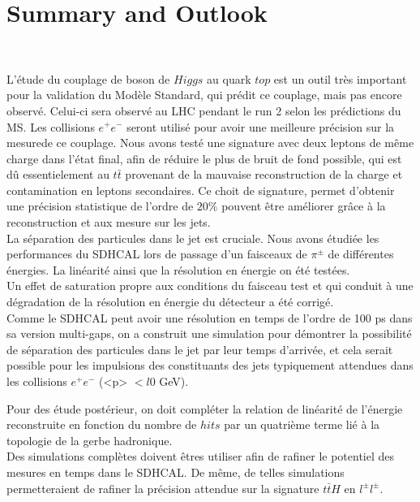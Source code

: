 \section*{Summary and Outlook}

~\par L'\'etude du couplage de boson de $Higgs$ au quark $top$ est un outil tr\`es important pour la validation du Mod\`ele Standard, qui pr\'edit ce couplage, mais pas encore observé. Celui-ci sera observé au LHC pendant le run 2 selon les prédictions du MS. Les collisions $e^+e^-$ seront utilisé pour avoir une meilleure pr\'ecision sur la mesurede ce couplage. Nous avons testé une signature avec deux leptons de m\^eme charge dans l'\'etat final, afin de réduire le plus de bruit de fond possible, qui est d\^u essentielement au $t\bar{t}$ provenant de la mauvaise reconstruction de la charge et contamination en leptons secondaires. Ce choit de signature, permet d'obtenir une précision statistique de l'ordre de $20\%$ pouvent être améliorer grâce à la reconstruction et aux mesure sur les jets.\\
La s\'eparation des particules dans le jet est cruciale. Nous avons \'etudiée les performances du SDHCAL lors de passage d'un faisceaux de $\pi^{\pm}$ de diff\'erentes \'energies. La linéarité ainsi que la résolution en énergie on été testées. \\
Un effet de saturation propre aux conditions du faisceau test et qui conduit \`a une d\'egradation de la r\'esolution en \'energie du d\'etecteur a été corrigé. \\
Comme le SDHCAL peut avoir une r\'esolution en temps de l'ordre de 100 ps dans sa version multi-gaps, on a construit une simulation pour d\'emontrer la possibilité de s\'eparation des particules dans le jet par leur temps d'arrivée, et cela serait possible pour les impulsions des constituants des jets typiquement attendues dans les collisions $e^+e^-$ (<p> $<l0$ GeV).
~\par Pour des \'etude post\'erieur, on doit compl\'eter la relation de lin\'earit\'e de l'\'energie reconstruite en fonction du nombre de $hits$ par un quatri\`eme terme li\'e \`a la topologie de la gerbe hadronique.\\
Des simulations complètes doivent êtres utiliser afin de rafiner le potentiel des mesures en temps dans le SDHCAL. De même, de telles simulations permetteraient de rafiner la précision attendue sur la signature $t\bar{t}H$ en $l^{\pm}l^{\pm}$.